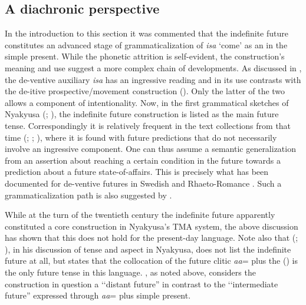 \subsection{A diachronic perspective}\label{isaFutDiachronic} In the introduction to this section it was commented that the indefinite future constitutes an advanced stage of grammaticalization of \textit{isa} `come' as an  in the simple present. While the phonetic attrition is self-evident, the construction's meaning and use suggest a more complex chain of developments. As discussed in , the de-ventive auxiliary \textit{isa} has an ingressive reading and in its  use contrasts with the de-itive prospective/movement construction (). Only the latter of the two allows a component of intentionality. Now, in the first grammatical sketches of Nyakyusa (\citealt{SchumannK1899}; \citealt{EndemannC1914}), the indefinite future construction is listed as the main future tense. Correspondingly it is relatively frequent in the text collections from that time (\citealt{BergerP1933}; \citealt{BusseJ1942}; \citeyear{BusseJ1949}), where it is found with future predictions that do not necessarily involve an ingressive component. One can thus assume a semantic generalization from an assertion about reaching a certain condition in the future towards a prediction about a future state-of-affairs. This is precisely what has been documented for de-ventive futures in Swedish \citep{ChristensenL1997} and Rhaeto-Romance \citep{EbneterT1973}. Such a grammaticalization path is also suggested by \citet{TraugottE1978}.

While at the turn of the twentieth century the indefinite future apparently constituted a core construction in Nyakyusa's TMA system, the above discussion has shown that this does not hold for the present-day language. Note also that \citeauthor{LusekeloA2007} (\citeyear{LusekeloA2007}; \citeyear{LusekeloA2013}), in his discussion of tense and aspect in Nyakyusa, does not list the indefinite future at all, but states that the collocation of the future clitic \textit{aa}= plus the  () is the only future tense in this language. \citet{NurseD1979}, as noted above, considers the construction in question a \lq\lq distant future'' in contrast to the \lq\lq intermediate future'' expressed through \mbox{\textit{aa}=} plus simple present.


